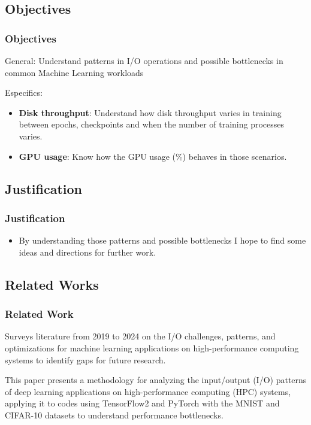 \documentclass[brazil, bsc, 10pt]{beamer}
\begin{document}
\subsection{Objectives}

\begin{frame}
	\frametitle{Objectives}
	\begin{block}{General:}
		Understand \alert{patterns in I/O operations and possible bottlenecks} in common
		Machine Learning workloads
	\end{block}
	\begin{block}{Especifics:}
		\begin{itemize}
			\item \textbf{Disk throughput}: Understand how disk throughput varies in training between epochs, checkpoints and when the number of training processes varies.

			\item \textbf{GPU usage}: Know how the GPU usage (\%) behaves in those scenarios.
		\end{itemize}
	\end{block}
\end{frame}

\subsection{Justification}

\begin{frame}
	\frametitle{Justification}
	\begin{block}{}
		\begin{itemize}
			\item By understanding those patterns and possible bottlenecks I hope to \alert{find some ideas and directions for further work}.
		\end{itemize}
	\end{block}
\end{frame}

\subsection{Related Works}

\begin{frame}
	\frametitle{Related Work}
	\begin{block}{}
		Surveys literature from 2019 to 2024 on the I/O challenges, patterns, and optimizations for machine learning applications on high-performance computing systems to identify gaps for future research.
	\end{block}

	\begin{block}{}
		This paper presents a methodology for analyzing the input/output (I/O) patterns of deep learning applications on high-performance computing (HPC) systems, applying it to codes using TensorFlow2 and PyTorch with the MNIST and CIFAR-10 datasets to understand performance bottlenecks.
	\end{block}
\end{frame}
\end{document}
